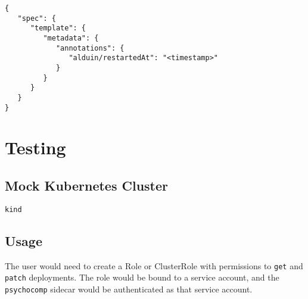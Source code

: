 \documentclass{article}
\begin{document}
\begin{verbatim}
{
   "spec": {
      "template": {
         "metadata": {
            "annotations": {
               "alduin/restartedAt": "<timestamp>"
            }
         }
      }
   }
}
\end{verbatim}

\section{Testing}

\subsection{Mock Kubernetes Cluster}

\texttt{kind}

\subsection{Usage}
The user would need to create a Role or ClusterRole
with permissions to \texttt{get} and \texttt{patch} deployments.
The role would be bound to a service account, and
the \texttt{psychocomp} sidecar would be authenticated as that service account.
\end{document}
